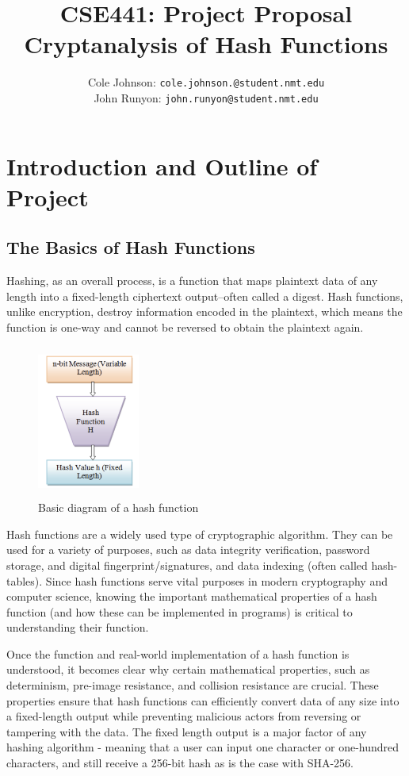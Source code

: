 \documentclass[12pt,english]{article}
\author{
    Cole Johnson: \texttt{cole.johnson.@student.nmt.edu}
    \\ 
    John Runyon: \texttt{john.runyon@student.nmt.edu}
}
\title{
    CSE441: Project Proposal\\
    \large{Cryptanalysis of Hash Functions}
}
\begin{document}
\maketitle
\section*{Introduction and Outline of Project}
\subsection*{The Basics of Hash Functions}
Hashing, as an overall process, is a function that maps
plaintext data of any length into a fixed-length ciphertext
output--often called a digest. Hash functions, unlike encryption,
destroy information encoded in the plaintext, which means
the function is one-way and cannot be reversed to obtain
the plaintext again.

\begin{figure}
    \begin{center}
      \includegraphics[clip=true,height=5cm, width=0.3\textwidth]{images/hash_function.png}
    \end{center}
    \caption{Basic diagram of a hash function}
  \end{figure}

Hash functions are a widely used type of cryptographic algorithm.
They can be used for a variety of purposes, such as
data integrity verification, password storage, and digital
fingerprint/signatures, and data indexing (often called hash-tables).
Since hash functions serve vital purposes in modern cryptography
and computer science, knowing the important mathematical properties
of a hash function (and how these can be implemented in programs)
is critical to understanding their function.

Once the function and real-world implementation of a
hash function is understood, it becomes clear why 
certain mathematical properties, such as determinism, 
pre-image resistance, and collision resistance are crucial. 
These properties ensure that hash functions can efficiently 
convert data of any size into a fixed-length output while 
preventing malicious actors from reversing or tampering with 
the data. The fixed length output is a major factor of any 
hashing algorithm - meaning that a user can input one character 
or one-hundred characters, and still receive a 256-bit hash as 
is the case with SHA-256.
\end{document}
